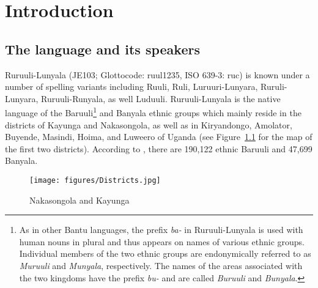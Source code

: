 \chapter{Introduction}
\section{The language and its speakers}\label{sec-language}

Ruruuli-Lunyala (JE103; Glottocode: ruul1235, ISO 639-3: ruc) is known under a number of  spelling variants including Ruuli, Ruli, Luruuri-Lu\-nya\-ra, Ruruli-Lunya\-ra, Ruruuli-Runyala, as well Luduuli. 
Ruruuli-Lu\-nyala is the native language of the Baruuli\footnote{As in other Bantu languages, the prefix \emph{ba-} in Ruruuli-Lu\-nyala is used with human nouns in plural and thus appears on names of various ethnic groups. 
Individual members of the two ethnic groups are endonymically referred to as \emph{Muruuli} and \emph{Munyala}, respectively. 
The names of the areas associated with the two kingdoms have the prefix \emph{bu-} and are called \emph{Buruuli} and \emph{Bunyala}.} and Banyala ethnic groups which mainly reside in the districts of Kayunga and Nakasongola, as well as in Kiryandongo, Amolator, Buyende, Masindi, Hoima, and Luweero of Uganda (see Figure~\ref{fig-Districts} for the map of the first two districts). 
According to \citet[71]{Uganda2016National}, there are 190,122  ethnic Baruuli and 47,699 Banyala. 


\begin{figure}[!htb]
\begin{center}
  \texttt{[image: figures/Districts.jpg]}
  \caption{Nakasongola and Kayunga \citep{OpenStreetMap}}\label{fig-Districts}
\end{center}
\end{figure}



